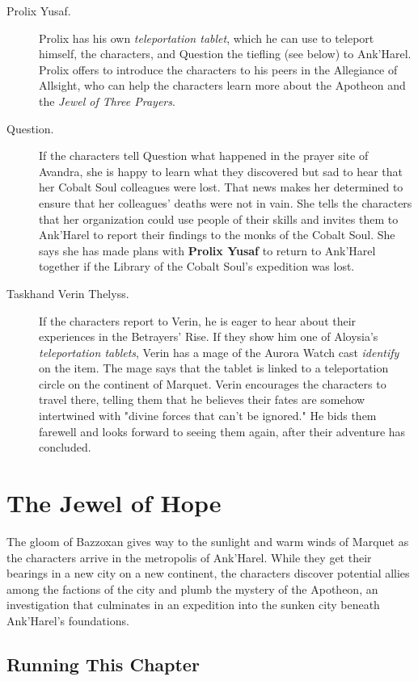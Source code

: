 \documentclass[a4paper, 11pt, bg=full, twocolumn, nooutline]{dndbook}
\begin{document}
\begin{description}
\item[Prolix Yusaf.] Prolix has his own \textit{teleportation tablet}, which he can use to teleport himself, the characters, and Question the tiefling (see below) to Ank'Harel. Prolix offers to introduce the characters to his peers in the Allegiance of Allsight, who can help the characters learn more about the Apotheon and the \textit{Jewel of Three Prayers}.
\item[Question.] If the characters tell Question what happened in the prayer site of Avandra, she is happy to learn what they discovered but sad to hear that her Cobalt Soul colleagues were lost. That news makes her determined to ensure that her colleagues' deaths were not in vain. She tells the characters that her organization could use people of their skills and invites them to Ank'Harel to report their findings to the monks of the Cobalt Soul. She says she has made plans with \textbf{Prolix Yusaf} to return to Ank'Harel together if the Library of the Cobalt Soul's expedition was lost.
\item[Taskhand Verin Thelyss.] If the characters report to Verin, he is eager to hear about their experiences in the Betrayers' Rise. If they show him one of Aloysia's \textit{teleportation tablets}, Verin has a mage of the Aurora Watch cast \textit{identify} on the item. The mage says that the tablet is linked to a teleportation circle on the continent of Marquet. Verin encourages the characters to travel there, telling them that he believes their fates are somehow intertwined with "divine forces that can't be ignored." He bids them farewell and looks forward to seeing them again, after their adventure has concluded.
\end{description}

\chapter{The Jewel of Hope}\label{ch:the-jewel-of-hope-5-5}

The gloom of Bazzoxan gives way to the sunlight and warm winds of Marquet as the characters arrive in the metropolis of Ank'Harel. While they get their bearings in a new city on a new continent, the characters discover potential allies among the factions of the city and plumb the mystery of the Apotheon, an investigation that culminates in an expedition into the sunken city beneath Ank'Harel's foundations.
\section{Running This Chapter}
\end{document}
